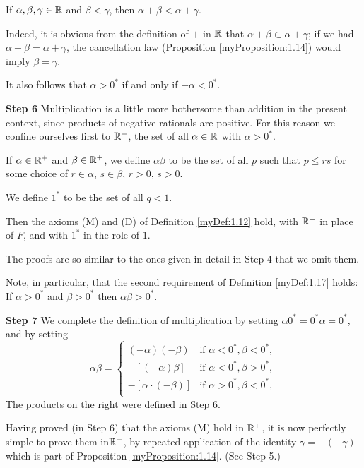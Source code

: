 If $\alpha, \beta, \gamma \in {\protect\mathbb R}$ and $\beta < \gamma$, then $\alpha + \beta < \alpha + \gamma$.

Indeed, it is obvious from the definition of $+$ in ${\protect\mathbb R}$ that $\alpha + \beta \subset \alpha + \gamma$; 
if we had $\alpha + \beta = \alpha + \gamma$, 
the cancellation law (Proposition \ref{myProposition:1.14}) would imply $\beta = \gamma$.

It also follows that $\alpha > 0^*$ if and only if $-\alpha < 0^*$.

\textbf{Step 6} 
Multiplication is a little more bothersome than addition in the present context, 
since products of negative rationals are positive. 
For this reason we confine ourselves first to ${\protect\mathbb R}^+$, 
the set of all $\alpha \in {\protect\mathbb R}$ with $\alpha > 0^*$.

If $\alpha \in {\protect\mathbb R}^+$ and $\beta \in {\protect\mathbb R}^+$, 
we define $\alpha\beta$ to be the set of all $p$ such that $p \leq rs$
for some choice of $r \in \alpha$, $s \in \beta$, $r>0$, $s>0$.

We define $1^*$ to be the set of all $q < 1$.

Then the axioms (M) and (D) of Definition \ref{myDef:1.12} hold, 
with ${\protect\mathbb R}^+$ in place of $F$, and with $1^*$ in the role of $1$.

The proofs are so similar to the ones given in detail in Step 4 that we omit them.

Note, in particular, that the second requirement of Definition \ref{myDef:1.17} holds:
If $\alpha > 0^*$ and $\beta > 0^*$ then $\alpha\beta > 0^*$.

\textbf{Step 7} 
We complete the definition of multiplication 
by setting $\alpha 0^* = 0^* \alpha = 0^*$,
and by setting
\begin{equation*}
    \alpha\beta = \left\{
        \begin{array}{ll}
            (-\alpha)(-\beta) & \text{if } \alpha < 0^*, \beta < 0^*,\\
            -[(-\alpha)\beta] & \text{if } \alpha < 0^*, \beta > 0^*,\\
            -[\alpha\cdot(-\beta)] & \text{if } \alpha > 0^*, \beta < 0^*,\\
        \end{array}
    \right.
\end{equation*}
The products on the right were defined in Step 6.

Having proved (in Step 6) that the axioms (M) hold in ${\protect\mathbb R}^+$, 
it is now perfectly simple to prove them in${\protect\mathbb R}^+$, 
by repeated application of the identity $\gamma = -(-\gamma)$ 
which is part of Proposition \ref{myProposition:1.14}. (See Step 5.)


